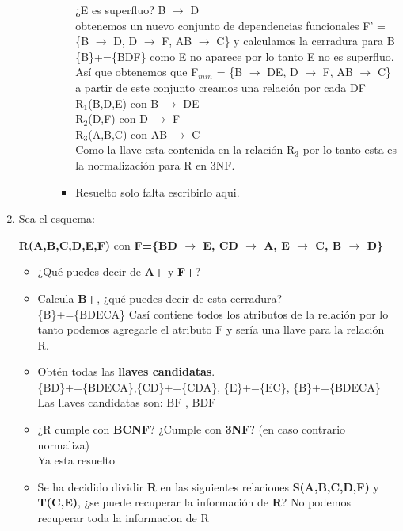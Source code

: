 \documentclass{article}
\begin{document}
\begin{enumerate}
\begin{itemize}
\begin{enumerate}
\begin{itemize}
   			¿E es superfluo? B $\rightarrow$ D\\
   			obtenemos un nuevo conjunto de dependencias funcionales F' = \{B $\rightarrow$ D, D $\rightarrow$ F, AB $\rightarrow$ C\} y calculamos la cerradura para B\\
   			\{B\}+=\{BDF\} como E no aparece por lo tanto E no es superfluo.\\
   			
   			Así que obtenemos que F$_{min}$ = \{B $\rightarrow$ DE, D $\rightarrow$ F, AB $\rightarrow$ C\} a partir de este conjunto creamos una relación por cada DF\\
   			R$_1$(B,D,E) con B $\rightarrow$ DE\\
   			R$_2$(D,F) con  D $\rightarrow$ F\\
   			R$_3$(A,B,C) con AB $\rightarrow$ C\\
   			
   			Como la llave esta contenida en la relación R$_3$ por lo tanto esta es la normalización para R en 3NF.\\
   			\item Resuelto solo falta escribirlo aqui.
   			
   		\end{itemize}
   	\end{enumerate}
   	
   \end{itemize}
 
    	\item Sea el esquema:\\
    	\begin{center}
    		\textbf{R(A,B,C,D,E,F)} con \textbf{F=\{BD $\rightarrow$ E, CD $\rightarrow$ A, E $\rightarrow$ C, B $\rightarrow$ D\}}
    	\end{center} 
    	\begin{itemize}
    		\item ¿Qué puedes decir de \textbf{{A}+} y \textbf{{F}+}?
    		\item Calcula \textbf{{B}+}, ¿qué puedes decir de esta cerradura?\\
    		\{B\}+=\{BDECA\} Casí contiene todos los atributos de la relación por lo tanto podemos agregarle el atributo F y sería una llave para la relación R.
    		\item  Obtén todas las \textbf{llaves candidatas}.\\
    		\{BD\}+=\{BDECA\},\{CD\}+=\{CDA\}, \{E\}+=\{EC\}, \{B\}+=\{BDECA\}\\
    		Las llaves candidatas son: BF , BDF
    		\item  ¿R cumple con \textbf{BCNF}? ¿Cumple con \textbf{3NF}? (en caso contrario normaliza) \\
    		Ya esta resuelto
    		\item  Se ha decidido dividir \textbf{R} en las siguientes relaciones \textbf{S(A,B,C,D,F)} y \textbf{T(C,E)}, ¿se puede recuperar la información de \textbf{R}? No podemos recuperar toda la informacion de R
    	\end{itemize}
    

\end{enumerate}
\end{document}
